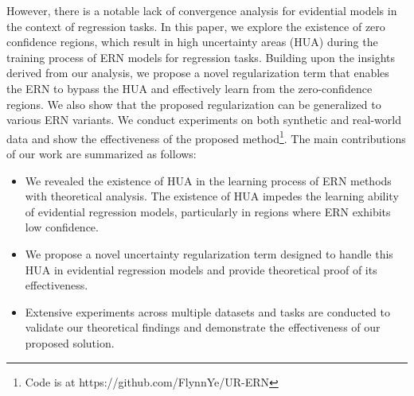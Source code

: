 However, there is a notable lack of convergence analysis for evidential models in the context of regression tasks.
In this paper, we explore the existence of zero confidence regions, which result in high uncertainty areas (HUA) during the training process of ERN models for regression tasks.
Building upon the insights derived from our analysis, we propose a novel regularization term that enables the ERN to bypass the HUA and effectively learn from the zero-confidence regions. 
We also show that the proposed regularization can be generalized to various ERN variants.
We conduct experiments on both synthetic and real-world data and show the effectiveness of the proposed method\footnote{Code is at https://github.com/FlynnYe/UR-ERN}. 
The main contributions of our work are summarized as follows:
\begin{itemize}
\item We revealed the existence of HUA in the learning process of ERN methods with theoretical analysis. The existence of HUA impedes the learning ability of evidential regression models, particularly in regions where ERN exhibits low confidence.
\item We propose a novel uncertainty regularization term designed to handle this HUA in evidential regression models and provide theoretical proof of its effectiveness.
\item Extensive experiments across multiple datasets and tasks are conducted to validate our theoretical findings and demonstrate the effectiveness of our proposed solution.
\end{itemize}






